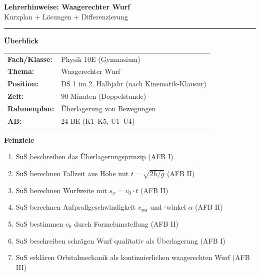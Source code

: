 \documentclass[10pt, a4paper]{article}
\newcommand{\fachfarbe}{physik}
\newcommand{\thema}{Waagerechter Wurf}
\newcommand{\abschnitt}[1]{%
    \vspace{8pt}
    \noindent\textbf{\textcolor{\fachfarbe}{#1}}
    \vspace{4pt}
}
\begin{document}
\begin{center}
{\large\bfseries Lehrerhinweise: \thema}\\[2pt]
{\small\textcolor{grau}{Kurzplan + Lösungen + Differenzierung}}
\end{center}

\vspace{-2pt}
\hrule
\vspace{8pt}


\abschnitt{Überblick}

\begin{tabular}{@{}ll@{}}
\textbf{Fach/Klasse:} & Physik 10E (Gymnasium) \\
\textbf{Thema:} & Waagerechter Wurf \\
\textbf{Position:} & DS 1 im 2. Halbjahr (nach Kinematik-Klausur) \\
\textbf{Zeit:} & 90 Minuten (Doppelstunde) \\
\textbf{Rahmenplan:} & Überlagerung von Bewegungen \\
\textbf{AB:} & 24 BE (K1--K5, Ü1--Ü4) \\
\end{tabular}

\vspace{8pt}

\abschnitt{Feinziele}

\begin{enumerate}[label=FZ\arabic*:]
    \item SuS beschreiben das Überlagerungsprinzip (AFB I)
    \item SuS berechnen Fallzeit aus Höhe mit $t = \sqrt{2h/g}$ (AFB II)
    \item SuS berechnen Wurfweite mit $s_x = v_0 \cdot t$ (AFB II)
    \item SuS berechnen Aufprallgeschwindigkeit $v_{\text{res}}$ und -winkel $\alpha$ (AFB II)
    \item SuS bestimmen $v_0$ durch Formelumstellung (AFB II)
    \item SuS beschreiben schrägen Wurf qualitativ als Überlagerung (AFB I)
    \item SuS erklären Orbitalmechanik als kontinuierlichen waagerechten Wurf (AFB III)
\end{enumerate}

\end{document}
